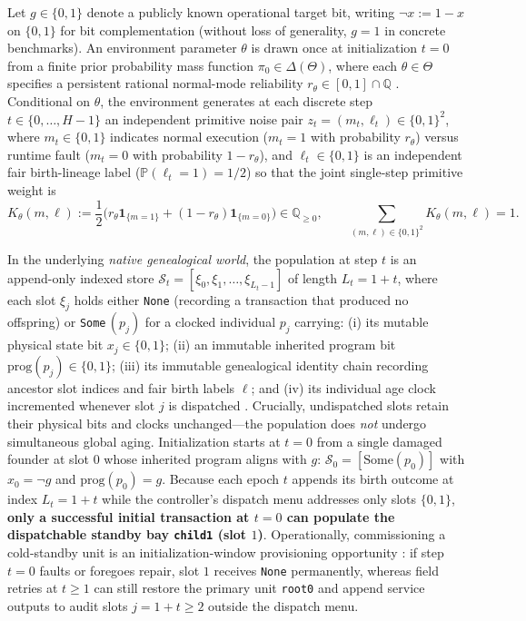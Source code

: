 \documentclass[11pt,letterpaper]{article}
\begin{document}
Let \(g \in \{0,1\}\) denote a publicly known operational target bit,
writing \(\neg x := 1 - x\) on \(\{0,1\}\) for bit complementation
(without loss of generality, \(g = 1\) in concrete benchmarks). An
environment parameter \(\theta\) is drawn once at initialization
\(t = 0\) from a finite prior probability mass function
\(\pi_0 \in \Delta(\Theta)\), where each \(\theta \in \Theta\) specifies
a persistent rational normal-mode reliability
\(r_\theta \in [0,1] \cap \mathbb{Q}\)
\citep{wald1950, savage1954, rieder1975}. Conditional on \(\theta\), the
environment generates at each discrete step \(t \in \{0, \dots, H-1\}\)
an independent primitive noise pair
\(z_t = (m_t, \ell_t) \in \{0,1\}^2\), where \(m_t \in \{0,1\}\)
indicates normal execution (\(m_t = 1\) with probability \(r_\theta\))
versus runtime fault (\(m_t = 0\) with probability \(1 - r_\theta\)),
and \(\ell_t \in \{0,1\}\) is an independent fair birth-lineage label
(\(\mathbb{P}(\ell_t = 1) = 1/2\)) so that the joint single-step
primitive weight is
\[K_\theta(m, \ell) := \frac{1}{2}\bigl(r_\theta \mathbf{1}_{\{m=1\}} + (1 - r_\theta)\mathbf{1}_{\{m=0\}}\bigr) \in \mathbb{Q}_{\ge 0}, \qquad \sum_{(m,\ell) \in \{0,1\}^2} K_\theta(m, \ell) = 1.\]

In the underlying \emph{native genealogical world}, the population at
step \(t\) is an append-only indexed store
\(\mathcal{S}_t = [\xi_0, \xi_1, \dots, \xi_{L_t - 1}]\) of length
\(L_t = 1 + t\), where each slot \(\xi_j\) holds either \texttt{None}
(recording a transaction that produced no offspring) or
\texttt{Some}\(\,(p_j)\) for a clocked individual \(p_j\) carrying: (i)
its mutable physical state bit \(x_j \in \{0,1\}\); (ii) an immutable
inherited program bit \(\mathrm{prog}(p_j) \in \{0,1\}\); (iii) its
immutable genealogical identity chain recording ancestor slot indices
and fair birth labels \(\ell\); and (iv) its individual age clock
incremented whenever slot \(j\) is dispatched
\citep{jagers1975, haccou2005}. Crucially, undispatched slots retain
their physical bits and clocks unchanged---the population does
\emph{not} undergo simultaneous global aging. Initialization starts at
\(t = 0\) from a single damaged founder at slot \(0\) whose inherited
program aligns with \(g\): \(\mathcal{S}_0 = [\mathrm{Some}(p_0)]\) with
\(x_0 = \neg g\) and \(\mathrm{prog}(p_0) = g\). Because each epoch
\(t\) appends its birth outcome at index \(L_t = 1 + t\) while the
controller's dispatch menu addresses only slots \(\{0, 1\}\),
\textbf{only a successful initial transaction at \(t = 0\) can populate
the dispatchable standby bay \texttt{child1} (slot \(1\))}.
Operationally, commissioning a cold-standby unit is an
initialization-window provisioning opportunity
\citep{barlowProschan1975}: if step \(t = 0\) faults or foregoes repair,
slot \(1\) receives \texttt{None} permanently, whereas field retries at
\(t \ge 1\) can still restore the primary unit \texttt{root0} and append
service outputs to audit slots \(j = 1 + t \ge 2\) outside the dispatch
menu.
\end{document}
